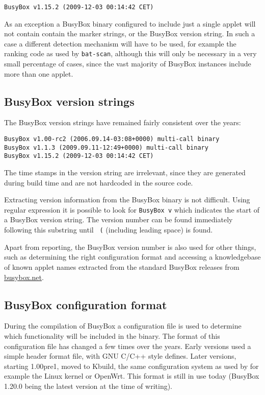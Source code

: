 \documentclass[10pt]{article}
\begin{document}
\begin{verbatim}
BusyBox v1.15.2 (2009-12-03 00:14:42 CET)
\end{verbatim}

As an exception a BusyBox binary configured to include just a single applet
will not contain contain the marker strings, or the BusyBox version string. In
such a case a different detection mechanism will have to be used, for example
the ranking code as used by \texttt{bat-scan}, although this will only be
necessary in a very small percentage of cases, since the vast majority of
BusyBox instances include more than one applet.

\subsection{BusyBox version strings}

The BusyBox version strings have remained fairly consistent over the years:

\begin{verbatim}
BusyBox v1.00-rc2 (2006.09.14-03:08+0000) multi-call binary
BusyBox v1.1.3 (2009.09.11-12:49+0000) multi-call binary
BusyBox v1.15.2 (2009-12-03 00:14:42 CET)
\end{verbatim}

The time stamps in the version string are irrelevant, since they are generated
during build time and are not hardcoded in the source code.

Extracting version information from the BusyBox binary is not difficult.
Using regular expression it is possible to look for \texttt{BusyBox v} which
indicates the start of a BusyBox version string. The version number can be
found immediately following this substring until \texttt{ (} (including
leading space) is found.

Apart from reporting, the BusyBox version number is also used for other
things, such as determining the right configuration format and accessing a
knowledgebase of known applet names extracted from the standard BusyBox
releases from \url{busybox.net}.

\subsection{BusyBox configuration format}

During the compilation of BusyBox a configuration file is used to determine
which functionality will be included in the binary. The format of this
configuration file has changed a few times over the years. Early versions used
a simple header format file, with GNU C/C++ style defines. Later versions,
starting 1.00pre1, moved to Kbuild, the same configuration system as used by
for example the Linux kernel or OpenWrt. This format is still in use today
(BusyBox 1.20.0 being the latest version at the time of writing).
\end{document}
